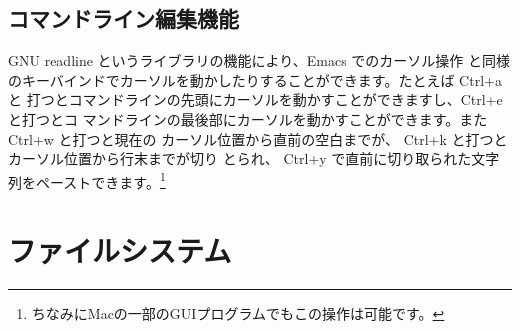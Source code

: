 \documentclass[platex]{jsarticle}
\begin{document}
 \subsection{コマンドライン編集機能}
 GNU readline というライブラリの機能により、Emacs でのカーソル操作
 と同様のキーバインドでカーソルを動かしたりすることができます。たとえば Ctrl+a と
 打つとコマンドラインの先頭にカーソルを動かすことができますし、Ctrl+e と打つとコ
 マンドラインの最後部にカーソルを動かすことができます。また Ctrl+w と打つと現在の
 カーソル位置から直前の空白までが、 Ctrl+k と打つとカーソル位置から行末までが切り
 とられ、 Ctrl+y で直前に切り取られた文字列をペーストできます。\footnote{ ちなみにMacの一部のGUIプログラムでもこの操作は可能です。}




%


\section{ファイルシステム}

\end{document}
